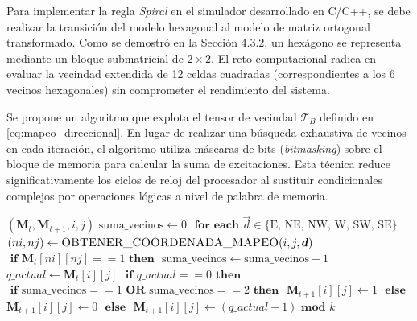 Para implementar la regla \textit{Spiral} en el simulador desarrollado en C/C++, se debe realizar la transición del modelo hexagonal al modelo de matriz ortogonal transformado. Como se demostró en la Sección 4.3.2, un hexágono se representa mediante un bloque submatricial de $2 \times 2$. El reto computacional radica en evaluar la vecindad extendida de 12 celdas cuadradas (correspondientes a los 6 vecinos hexagonales) sin comprometer el rendimiento del sistema.

Se propone un algoritmo que explota el tensor de vecindad $\mathcal{T}_B$ definido en \eqref{eq:mapeo_direccional}. En lugar de realizar una búsqueda exhaustiva de vecinos en cada iteración, el algoritmo utiliza máscaras de bits (\textit{bitmasking}) sobre el bloque de memoria para calcular la suma de excitaciones. Esta técnica reduce significativamente los ciclos de reloj del procesador al sustituir condicionales complejos por operaciones lógicas a nivel de palabra de memoria.

\begin{algorithm}[H]
\caption{Cómputo Optimizado de la Regla Spiral sobre Bloques 2x2.}\label{alg:spiral_optimizado}
\begin{algorithmic}
\STATE 
{}$(\mathbf{M}_{t}, \mathbf{M}_{t+1}, i, j)$
\STATE \hspace{0.5cm}$ \text{suma\_vecinos} \gets 0 $
\STATE \hspace{0.5cm}$ \textbf{ for each } \vec{d} \in \{\text{E, NE, NW, W, SW, SE}\} $
\STATE \hspace{1.0cm}$ (ni, nj) \gets \textsc{OBTENER\_COORDENADA\_MAPEO}(i, j, \vec{d}) $
\STATE \hspace{1.0cm}$ \textbf{ if } \mathbf{M}_{t}[ni][nj] == 1 \textbf{ then } $
\STATE \hspace{1.5cm}$ \text{suma\_vecinos} \gets \text{suma\_vecinos} + 1 $
\STATE \hspace{0.5cm}$ q\_actual \gets \mathbf{M}_{t}[i][j] $
\STATE \hspace{0.5cm}$ \textbf{ if } q\_actual == 0 \textbf{ then } $
\STATE \hspace{1.0cm}$ \textbf{ if } \text{suma\_vecinos} == 1 \textbf{ OR } \text{suma\_vecinos} == 2 \textbf{ then } $
\STATE \hspace{1.5cm}$ \mathbf{M}_{t+1}[i][j] \gets 1 $
\STATE \hspace{1.0cm}$ \textbf{ else } $
\STATE \hspace{1.5cm}$ \mathbf{M}_{t+1}[i][j] \gets 0 $
\STATE \hspace{0.5cm}$ \textbf{ else } $
\STATE \hspace{1.0cm}$ \mathbf{M}_{t+1}[i][j] \gets (q\_actual + 1) \textbf{ mod } k $
\STATE
\end{algorithmic}
\end{algorithm}

